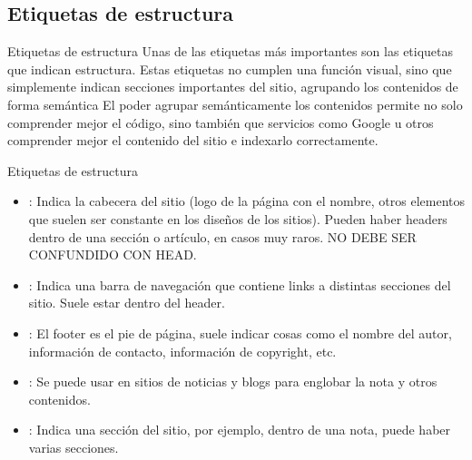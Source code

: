 \subsection{Etiquetas de estructura}


\begin{frame}[fragile]{Etiquetas de estructura}
	Unas de las etiquetas más importantes son las etiquetas que indican estructura.
	\jump
	Estas etiquetas no cumplen una función visual, sino que simplemente indican
	secciones importantes del sitio, agrupando los contenidos de forma semántica
	\jump
	El poder agrupar semánticamente los contenidos permite no solo comprender
	mejor el código, sino también que servicios como Google u otros comprender
	mejor el contenido del sitio e indexarlo correctamente.
\end{frame}


\begin{frame}[fragile]{Etiquetas de estructura}
	\begin{itemize}
		\item {}: Indica la cabecera del sitio (logo de la página con el
			nombre, otros elementos que suelen ser constante en los diseños de los sitios).
			Pueden haber headers dentro de una sección o artículo, en casos muy raros.
			NO DEBE SER CONFUNDIDO CON HEAD.
		\item {}: Indica una barra de navegación que contiene links a distintas
			secciones del sitio. Suele estar dentro del header.
		\item {}: El footer es el pie de página, suele indicar cosas como
			el nombre del autor, información de contacto, información de copyright, etc.
		\item {}: Se puede usar en sitios de noticias y blogs para englobar
			la nota y otros contenidos.
		\item {}: Indica una sección del sitio, por ejemplo, dentro de una
			nota, puede haber varias secciones.
\end{itemize}
\end{frame}


